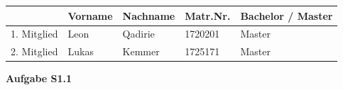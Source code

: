 \documentclass[ngerman, a4paper,12pt]{article}
\newcommand{\R}{\mathbb R} %
\begin{document}
\begin{table}[h]
	\centering
	\begin{tabularx}{\textwidth}{X X X X X}
		 & Vorname & Nachname & Matr.Nr. & Bachelor / Master \\
		\toprule
		1. Mitglied & Leon & Qadirie & 1720201 &  Master\\
		2. Mitglied & Lukas & Kemmer & 1725171 &  Master\\
		\bottomrule
	\end{tabularx}
\end{table}
\textbf{Aufgabe S1.1} \\
\end{document}
